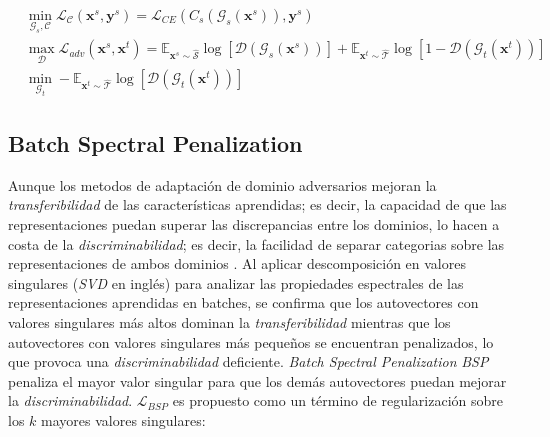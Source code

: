 \begin{align}
   & \min_{\mathcal{G}_s, \mathcal{C}} \mathcal{L}_\mathcal{C}(\mathbf{x}^s, \mathbf{y}^s)                                                            = \mathcal{L}_{CE}(C_s(\mathcal{G}_s(\mathbf{x}^s)), \mathbf{y}^s)
  \label{eq:adda-loss-clasificadora}                                                                                                                                                                                                                                                                                                                                                          \\
   & \max_{\mathcal{D}} \mathcal{L}_{adv}(\mathbf{x}^s, \mathbf{x}^t)                                                                                 = \mathbb{E}_{\mathbf{x}^s \sim \mathcal{\hat{S}}}\log[\mathcal{D}(\mathcal{G}_s(\mathbf{x}^s))] + \mathbb{E}_{\mathbf{x}^t \sim \mathcal{\hat{T}}}\log[1-\mathcal{D}(\mathcal{G}_t(\mathbf{x}^t))] \label{eq:adda-loss-discriminadora} \\
   & \min_{\mathcal{G}_t} - \mathbb{E}_{\mathbf{x}^t \sim \mathcal{\hat{T}}} \log[\mathcal{D}(\mathcal{G}_t(\mathbf{x}^t))]  \label{eq:adda-objetivo}
\end{align}

\subsection{Batch Spectral Penalization}

Aunque los metodos de adaptación de dominio adversarios mejoran la {\it transferibilidad} de las características
aprendidas; es decir, la capacidad de que las representaciones puedan superar las discrepancias entre los dominios, lo
hacen a costa de la {\it discriminabilidad}; es decir, la facilidad de separar categorias sobre las representaciones de
ambos dominios \parencite{chen2019transferability}. Al aplicar descomposición en valores singulares ({\it SVD} en inglés) para analizar
las propiedades espectrales de las representaciones aprendidas en batches, se confirma que los autovectores con valores
singulares más altos dominan la {\it transferibilidad} mientras que los autovectores con valores singulares más
pequeños se encuentran penalizados, lo que provoca una {\it discriminabilidad} deficiente. {\it Batch Spectral
    Penalization} {\it BSP} \parencite{chen2019transferability} penaliza el mayor valor singular para que los demás autovectores puedan mejorar la {\it
    discriminabilidad}. $\mathcal{L}_{BSP}$ es propuesto como un término de regularización sobre los $k$ mayores valores
singulares:

